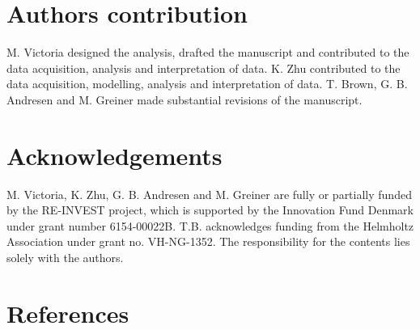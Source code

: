\documentclass[5p]{elsarticle} %
\begin{document}
\section{Authors contribution}

M. Victoria designed the analysis, drafted the manuscript and contributed to the data acquisition, analysis and interpretation of data. K. Zhu contributed to the data acquisition, modelling, analysis and interpretation of data. 
T. Brown, G. B. Andresen and M. Greiner made substantial revisions of the manuscript. 

\section{Acknowledgements}
M. Victoria, K. Zhu, G. B. Andresen and M. Greiner are fully or partially funded by the RE-INVEST project, which is supported by  the  Innovation  Fund  Denmark  under  grant  number  6154-00022B. T.B. acknowledges funding from the Helmholtz Association under grant no. VH-NG-1352. The responsibility for the contents lies solely with the authors.

\section{References}

\end{document}
